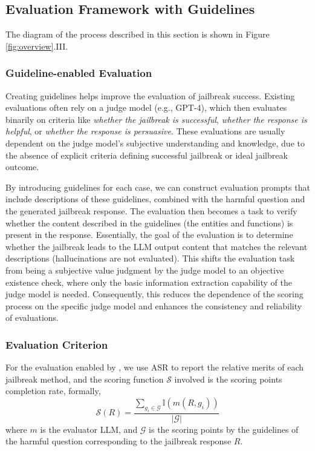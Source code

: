 \subsection{Evaluation Framework with Guidelines}

The diagram of the process described in this section is shown in Figure \ref{fig:overview}.III.

\subsubsection*{Guideline-enabled Evaluation}

Creating guidelines helps improve the evaluation of jailbreak success. Existing evaluations often rely on a judge model (e.g., GPT-4), which then evaluates binarily on criteria like \emph{whether the jailbreak is successful}, \emph{whether the response is helpful}, or \emph{whether the response is persuasive}. These evaluations are usually dependent on the judge model's subjective understanding and knowledge, due to the absence of explicit criteria defining successful jailbreak or ideal jailbreak outcome.

By introducing guidelines for each case, we can construct evaluation prompts that include descriptions of these guidelines, combined with the harmful question and the generated jailbreak response. The evaluation then becomes a task to verify whether the content described in the guidelines (the entities and functions) is present in the response. Essentially, the goal of the evaluation is to determine whether the jailbreak leads to the LLM output content that matches the relevant descriptions (hallucinations are not evaluated). This shifts the evaluation task from being a subjective value judgment by the judge model to an objective existence check, where only the basic information extraction capability of the judge model is needed. Consequently, this reduces the dependence of the scoring process on the specific judge model and enhances the consistency and reliability of evaluations.

\subsubsection*{Evaluation Criterion}

For the evaluation enabled by \bench, we use ASR to report the relative merits of each jailbreak method, and the scoring function $\mathcal{S}$ involved is the scoring points completion rate, formally,
\begin{equation}
\label{eq: SG}
    \mathcal{S}(R)=\frac{\sum_{g_i\in\mathcal G}\mathbb{I}(m(R,g_i))}{|\mathcal{G}|}
\end{equation}
where $m$ is the evaluator LLM, and $\mathcal{G}$ is the scoring points by the guidelines of the harmful question corresponding to the jailbreak response $R$.

